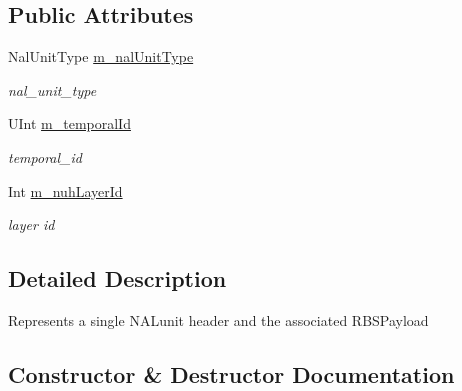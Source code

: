 \subsection*{Public Attributes}
\begin{DoxyCompactItemize}
\item 
\mbox{\label{struct_n_a_l_unit_aa80725122142d6870e41aed24dc8deb6}} 
Nal\+Unit\+Type \hyperlink{struct_n_a_l_unit_aa80725122142d6870e41aed24dc8deb6}{m\+\_\+nal\+Unit\+Type}
\begin{DoxyCompactList}\small\item\em nal\+\_\+unit\+\_\+type \end{DoxyCompactList}\item 
\mbox{\label{struct_n_a_l_unit_a588e88c076ed4bfff3ccae67449d1676}} 
U\+Int \hyperlink{struct_n_a_l_unit_a588e88c076ed4bfff3ccae67449d1676}{m\+\_\+temporal\+Id}
\begin{DoxyCompactList}\small\item\em temporal\+\_\+id \end{DoxyCompactList}\item 
\mbox{\label{struct_n_a_l_unit_a001e256a9e5c0a4eb596e6cb910ed787}} 
Int \hyperlink{struct_n_a_l_unit_a001e256a9e5c0a4eb596e6cb910ed787}{m\+\_\+nuh\+Layer\+Id}
\begin{DoxyCompactList}\small\item\em layer id \end{DoxyCompactList}\end{DoxyCompactItemize}


\subsection{Detailed Description}
Represents a single N\+A\+Lunit header and the associated R\+B\+S\+Payload 

\subsection{Constructor \& Destructor Documentation}
\mbox{\label{struct_n_a_l_unit_a6c3d113f4dedfc580c685330abd8d66c}} 
